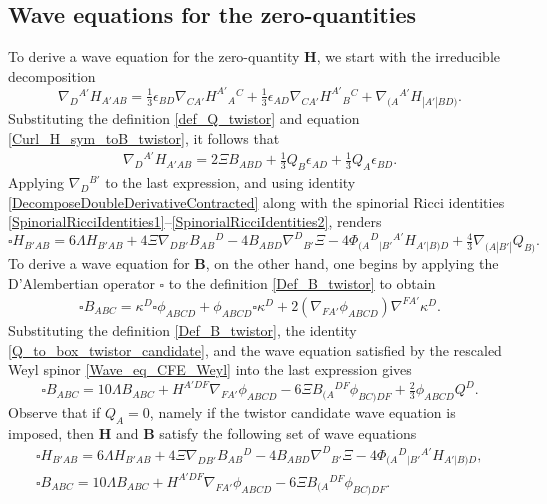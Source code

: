 \documentclass[10pt,a4paper]{article}
\theoremstyle{plain}
\def\bmB{{\bm B}}
\def\bmH{{\bm H}}
\begin{document}
\subsection{Wave equations for the zero-quantities}

To derive a wave equation for the zero-quantity $\bmH$, we start with the irreducible decomposition
\[
\nabla_{D}{}^{A'}H_{A'AB} = \tfrac{1}{3} \epsilon _{BD}
\nabla_{CA'}H^{A'}{}_{A}{}^{C} + \tfrac{1}{3} \epsilon _{AD}
\nabla_{CA'}H^{A'}{}_{B}{}^{C} + \nabla_{(A}{}^{A'}H_{|A'|BD)}.
\]
Substituting the definition \eqref{def_Q_twistor} and equation
\eqref{Curl_H_sym_toB_twistor}, it follows that
\begin{align}\label{derH_twistor_toBandQ}
\nabla_{D}{}^{A'}H_{A'AB} = 2 \Xi B_{ABD}  + \tfrac{1}{3} Q_{B}
\epsilon _{AD} + \tfrac{1}{3} Q_{A} \epsilon _{BD}.
\end{align}
Applying $\nabla_{D}{}^{B'}$ to the last expression, and using
identity \eqref{DecomposeDoubleDerivativeContracted} along with the
spinorial Ricci identities
\eqref{SpinorialRicciIdentities1}--\eqref{SpinorialRicciIdentities2},
renders
\begin{equation}\label{wave_H_twistor}
  \square H_{B'AB} = 6 \Lambda H_{B'AB} + 4 \Xi
  \nabla_{DB'}B_{AB}{}^{D} -4 B_{ABD} \nabla^{D}{}_{B'}\Xi -4
  \Phi_{(A}{}^{D}{}_{|B'}{}^{A'}H_{A'|B)D} + \tfrac{4}{3}
  \nabla_{(A|B'|}Q_{B)}.
\end{equation}
To derive a wave equation for $\bmB$, on the other hand, one begins by applying the D'Alembertian
operator $\square$ to the definition \eqref{Def_B_twistor} to obtain
\begin{align}\label{pre_wave_B_twistor}
\square B_{ABC} = \kappa ^{D} \square \phi _{ABCD} + \phi _{ABCD}
\square \kappa ^{D} + 2 (\nabla_{FA'}\phi _{ABCD}) \nabla^{FA'}\kappa
^{D}.
\end{align}
Substituting the definition \eqref{Def_B_twistor}, the identity
\eqref{Q_to_box_twistor_candidate}, and the wave equation satisfied by
the rescaled Weyl spinor \eqref{Wave_eq_CFE_Weyl} into the last
expression gives
\begin{equation}\label{wave_B_twistor}
\square B_{ABC} = 10 \Lambda B_{ABC} + H^{A'DF} \nabla_{FA'}\phi
_{ABCD} -6 \Xi B_{(A}{}^{DF}\phi _{BC)DF} + \tfrac{2}{3} \phi _{ABCD}
Q^{D}.
\end{equation}
Observe that if $Q_{A}=0$, namely if the twistor candidate wave
equation is imposed, then $\bmH$ and $\bmB$ satisfy the following set
of wave equations
\begin{subequations}
\begin{eqnarray}
  && \square H_{B'AB} = 6 \Lambda H_{B'AB} + 4 \Xi
  \nabla_{DB'}B_{AB}{}^{D}  -4 B_{ABD} \nabla^{D}{}_{B'}\Xi   -4 \Phi_{(A}{}^{D}{}_{|B'}{}^{A'}H_{A'|B)D},\qquad
   \label{Hom_wave_HandB1} \\
 && \square B_{ABC} = 10\Lambda B_{ABC} + H^{A'DF} \nabla_{FA'}\phi _{ABCD}  -6 \Xi B_{(A}{}^{DF}\phi
_{BC)DF}.  \label{Hom_wave_HandB2}
\end{eqnarray}
\end{subequations}
\end{document}
